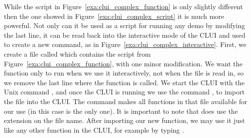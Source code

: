 \documentclass[12pt]{report}
\begin{document}
 While the script in Figure~\ref{exa:clui_complex_function} is 
 only slightly different then the one showed in 
 Figure~\ref{exa:clui_complex_script} it is much more powerful.
 Not only can it be used as a script for running any demo
 by modifying the last line, it can be read back into
 the interactive mode of the \AUTO CLUI and
 used to create a new command, 
 as in Figure~\ref{exa:clui_complex_interactive}.
 First, we create a file called 
 which contains the script from 
 Figure~\ref{exa:clui_complex_function}, with
 one minor modification.  We want the function only
 to run when we use it interactively, not when
 the file  is read in, so we
 remove the last line where the function is called.
 We start the \AUTO CLUI with the Unix command
 , and once the \AUTO CLUI is running
 we use the command ,
 to import the file  into the
 \AUTO CLUI.  The  command makes
 all functions in that file available for
 our use (in this case  is the only 
 one).  It is important to note that 
  does 
 use the  extension on the file name. 
 After importing our new function, we may use it
 just like any other function in the \AUTO
 CLUI, for example by typing .
\end{document}
